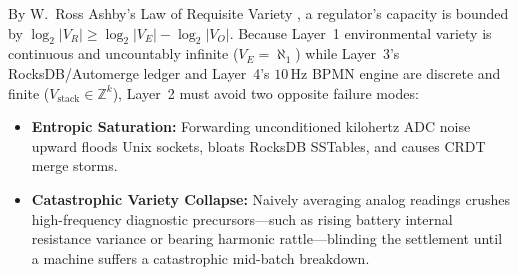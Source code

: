 By W.~Ross Ashby's Law of Requisite Variety \parencite{ashby1956}, a regulator's capacity is bounded by $\log_2 |V_R| \ge \log_2 |V_E| - \log_2 |V_O|$. Because Layer~1 environmental variety is continuous and uncountably infinite ($V_E = \aleph_1$) while Layer~3's RocksDB/Automerge ledger and Layer~4's $10\,\mathrm{Hz}$ BPMN engine are discrete and finite ($V_{\mathrm{stack}} \in \mathbb{Z}^k$), Layer~2 must avoid two opposite failure modes:
\begin{itemize}
    \item \textbf{Entropic Saturation:} Forwarding unconditioned kilohertz ADC noise upward floods Unix sockets, bloats RocksDB SSTables, and causes CRDT merge storms.
    \item \textbf{Catastrophic Variety Collapse:} Naively averaging analog readings crushes high-frequency diagnostic precursors---such as rising battery internal resistance variance or bearing harmonic rattle---blinding the settlement until a machine suffers a catastrophic mid-batch breakdown.
\end{itemize}

